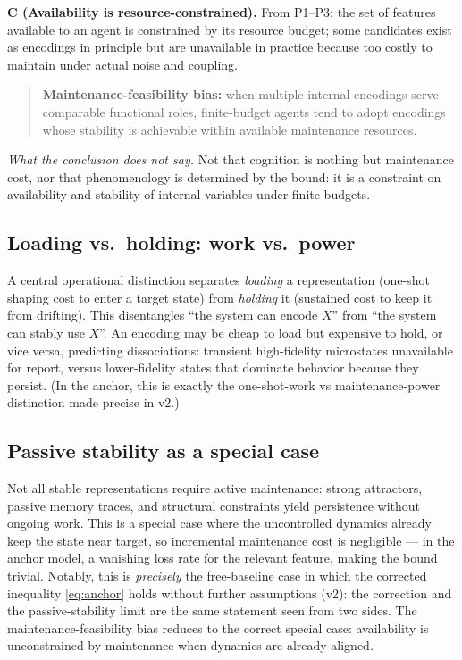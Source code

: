 \documentclass[11pt,a4paper]{article}
\begin{document}
\textbf{C (Availability is resource-constrained).} From P1--P3: the set of
features available to an agent is constrained by its resource budget; some
candidates exist as encodings in principle but are unavailable in practice
because too costly to maintain under actual noise and coupling.

\begin{quote}
\textbf{Maintenance-feasibility bias:} when multiple internal encodings serve
comparable functional roles, finite-budget agents tend to adopt encodings
whose stability is achievable within available maintenance resources.
\end{quote}

\emph{What the conclusion does not say.} Not that cognition is nothing but
maintenance cost, nor that phenomenology is determined by the bound: it is a
constraint on availability and stability of internal variables under finite
budgets.

\subsection{Loading vs.\ holding: work vs.\ power}

A central operational distinction separates \emph{loading} a representation
(one-shot shaping cost to enter a target state) from \emph{holding} it
(sustained cost to keep it from drifting). This disentangles ``the system can
encode $X$'' from ``the system can stably use $X$''. An encoding may be cheap
to load but expensive to hold, or vice versa, predicting dissociations:
transient high-fidelity microstates unavailable for report, versus
lower-fidelity states that dominate behavior because they persist. (In the
anchor, this is exactly the one-shot-work vs maintenance-power distinction
made precise in \cite{Work,HCut} v2.)

\subsection{Passive stability as a special case}

Not all stable representations require active maintenance: strong attractors,
passive memory traces, and structural constraints yield persistence without
ongoing work. This is a special case where the uncontrolled dynamics already
keep the state near target, so incremental maintenance cost is negligible ---
in the anchor model, a vanishing loss rate for the relevant feature, making
the bound trivial. Notably, this is \emph{precisely} the free-baseline case
in which the corrected inequality \eqref{eq:anchor} holds without further
assumptions \cite{Work} (v2): the correction and the passive-stability limit
are the same statement seen from two sides. The maintenance-feasibility bias
reduces to the correct special case: availability is unconstrained by
maintenance when dynamics are already aligned.
\end{document}

